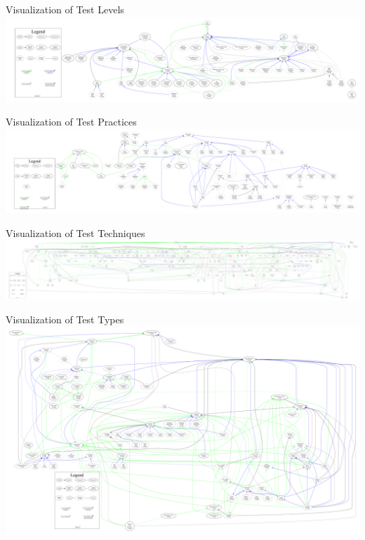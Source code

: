 \begin{frame}{Visualization of Test Levels}
    \includegraphics[width=\textwidth]{assets/graphs/levelGraph.pdf}
\end{frame}

\begin{frame}{Visualization of Test Practices}
    \includegraphics[width=\textwidth]{assets/graphs/practiceGraph.pdf}
\end{frame}

\begin{frame}{Visualization of Test Techniques}
    \includegraphics[width=\textwidth]{assets/graphs/techniqueGraph.pdf}
\end{frame}

\begin{frame}{Visualization of Test Types}
    \includegraphics[width=\textwidth]{assets/graphs/typeGraph.pdf}
\end{frame}

